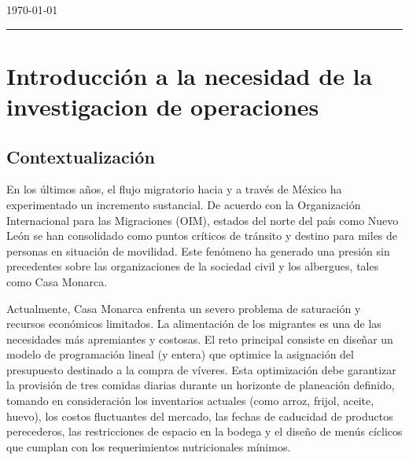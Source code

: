 \documentclass[12pt]{report}
\begin{document}
\begin{titlepage}
\begin{tikzpicture}[tdplot_main_coords, scale=3, line join=round, line cap=round]
\end{tikzpicture}

\vspace{1cm}

{\large \today \par}
\vfill

\rule{0.5\textwidth}{0.5pt}\par
\vspace{0.3cm}
\pagebreak

\end{titlepage}

\pagebreak



\tableofcontents

\chapter{Introducción a la necesidad de la investigacion de operaciones}

\section{Contextualización}
En los últimos años, el flujo migratorio hacia y a través de México ha experimentado un incremento sustancial. De acuerdo con la Organización Internacional para las Migraciones (OIM), estados del norte del país como Nuevo León se han consolidado como puntos críticos de tránsito y destino para miles de personas en situación de movilidad. Este fenómeno ha generado una presión sin precedentes sobre las organizaciones de la sociedad civil y los albergues, tales como Casa Monarca.

Actualmente, Casa Monarca enfrenta un severo problema de saturación y recursos económicos limitados. La alimentación de los migrantes es una de las necesidades más apremiantes y costosas. El reto principal consiste en diseñar un modelo de programación lineal (y entera) que optimice la asignación del presupuesto destinado a la compra de víveres. Esta optimización debe garantizar la provisión de tres comidas diarias durante un horizonte de planeación definido, tomando en consideración los inventarios actuales (como arroz, frijol, aceite, huevo), los costos fluctuantes del mercado, las fechas de caducidad de productos perecederos, las restricciones de espacio en la bodega y el diseño de menús cíclicos que cumplan con los requerimientos nutricionales mínimos.
\end{document}
